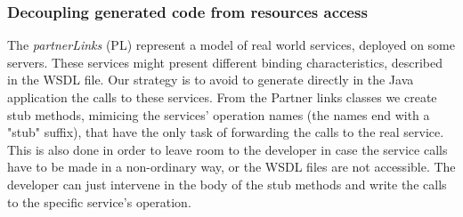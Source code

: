 \subsubsection{Decoupling generated code from resources access}
\label{sec:decouplingPL}
The \textit{partnerLinks} (PL) represent a model of real world services, deployed on some servers. These services might present different binding characteristics, described in the WSDL file. Our strategy is to avoid to generate directly in the Java application the calls to these services. From the Partner links classes we create stub methods, mimicing the services' operation names (the names end with a "stub" suffix), that have the only task of forwarding the calls to the real service. 
This is also done in order to leave room to the developer in case the service calls have to be made in a non-ordinary way, or the WSDL files are not accessible. The developer can just intervene in the body of the stub methods and write the calls to the specific service's operation.

